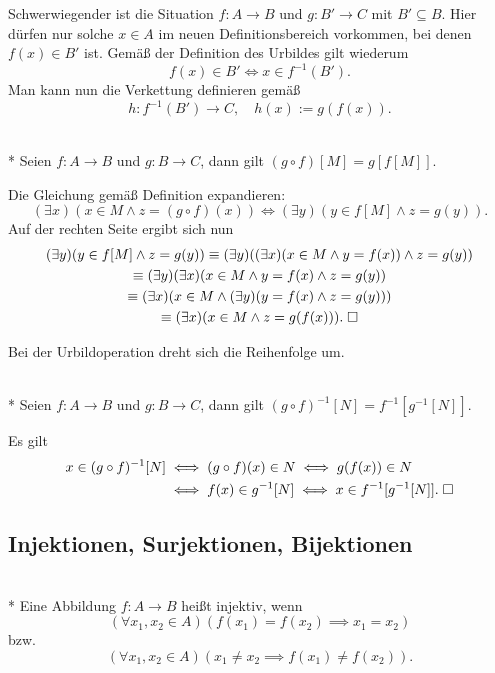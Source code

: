 \noindent
Schwerwiegender ist die Situation $f\colon A\to B$
und $g\colon B'\to C$ mit $B'\subseteq B$. Hier dürfen nur
solche $x\in A$ im neuen Definitionsbereich vorkommen, bei
denen $f(x)\in B'$ ist. Gemäß der Definition des Urbildes
gilt wiederum
\[f(x)\in B'\iff x\in f^{-1}(B').\]
Man kann nun die Verkettung definieren gemäß
\[h\colon f^{-1}(B')\to C,\quad h(x):=g(f(x)).\]

\begin{Satz}\label{img-comp}\mbox{}\\*
Seien $f\colon A\to B$ und $g\colon B\to C$, dann gilt
$(g\circ f)[M] = g[f[M]]$.
\end{Satz}
 Die Gleichung gemäß Definition expandieren:
\[(\exists x)(x\in M\land z
= (g\circ f)(x))\iff (\exists y)(y\in f[M]\land z=g(y)).\]
Auf der rechten Seite ergibt sich nun
\begin{gather*}
(\exists y)(y\in f[M]\land z=g(y))
\equiv (\exists y)((\exists x)(x\in M\land y=f(x))\land z=g(y))\\
\equiv (\exists y)(\exists x)(x\in M\land y=f(x)\land z=g(y))\\
\equiv (\exists x)(x\in M\land (\exists y)(y=f(x)\land z=g(y)))\\
\equiv (\exists x)(x\in M\land z=g(f(x))).\;\Box
\end{gather*}

\noindent
Bei der Urbildoperation dreht sich die Reihenfolge um.

\begin{Satz}\mbox{}\\*
Seien $f\colon A\to B$ und $g\colon B\to C$, dann gilt
$(g\circ f)^{-1}[N] = f^{-1}[g^{-1}[N]]$.
\end{Satz}
 Es gilt
\begin{align*}
x\in (g\circ f)^{-1}[N] &\iff (g\circ f)(x)\in N\iff g(f(x))\in N\\
&\iff f(x)\in g^{-1}[N] \iff x\in f^{-1}[g^{-1}[N]].\;\Box
\end{align*}


\subsection{Injektionen, Surjektionen, Bijektionen}

\begin{Definition}\mbox{}\\*
Eine Abbildung $f\colon A\to B$ heißt injektiv, wenn
\[(\forall x_1,x_2\in A)(f(x_1)=f(x_2)\implies x_1=x_2)\]
bzw.
\[(\forall x_1,x_2\in A)(x_1\ne x_2\implies f(x_1)\ne f(x_2)).\]
\end{Definition}


